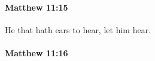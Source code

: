 		\paragraph{Matthew 11:15} %
			\label{MATTHEW-11-15}

			He that hath ears to hear, let him hear.

			\begin{framed}
			\scriptsize
				\begin{compactdesc}
					\item[SBLG] 
				\end{compactdesc}
			\end{framed}

		\paragraph{Matthew 11:16} %
			\label{MATTHEW-11-16}

